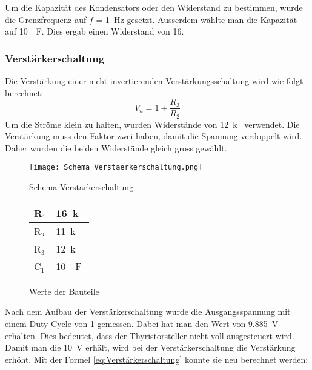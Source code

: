 Um die Kapazität des Kondensators oder den Widerstand zu bestimmen, wurde die Grenzfrequenz auf $f$ = \SI{1}{Hz} gesetzt. Ausserdem wählte man die Kapazität auf \SI{10}{\mu F}. Dies ergab einen Widerstand von \SI{16}{\Omega}. 




\subsubsection{Verstärkerschaltung}
Die Verstärkung einer nicht invertierenden Verstärkungsschaltung wird wie folgt berechnet:
\begin{equation}\label{eq:Verstärkerschaltung}
V_u = 1 + \frac{R_3}{R_2}
\end{equation}
Um die Ströme klein zu halten, wurden Widerstände von \SI{12}{k\Omega} verwendet. Die Verstärkung muss den Faktor zwei haben, damit die Spannung verdoppelt wird. Daher wurden die beiden Widerstände gleich gross gewählt.


\newpage
\begin{figure}[ht!]  
	\centering 
	\begin{minipage}[t]{.76\textwidth} \centering 
		\centering
		\texttt{[image: Schema\_Verstaerkerschaltung.png]}	
		\caption{Schema Verstärkerschaltung}\label{fig:Verstaerkerschaltung}
	\end{minipage}	
	\begin{minipage}[b]{.23\textwidth}
		\centering
		\begin{tabular}{|l|l|}
			\hline
			R$_1$ & \SI{16}{k\Omega} 	\\ 	\hline
			R$_2$ & \SI{11}{k\Omega} 	\\ 	\hline
			R$_3$ & \SI{12}{k\Omega} 	\\	\hline
			C$_1$ & \SI{10}{\mu F} 		\\	\hline
		\end{tabular}
		\caption{Werte der Bauteile}
		\label{tab:Verstaerkerschaltung}
	\end{minipage}
\end{figure} 



Nach dem Aufbau der Verstärkerschaltung wurde die Ausgangsspannung mit einem Duty Cycle von 1 gemessen. Dabei hat man den Wert von \SI{9.885}{V} erhalten. Dies bedeutet, dass der Thyristorsteller nicht voll ausgesteuert wird. Damit man die \SI{10}{V} erhält, wird bei der Verstärkerschaltung die Verstärkung erhöht. Mit der Formel \ref{eq:Verstärkerschaltung} konnte sie neu berechnet werden:

